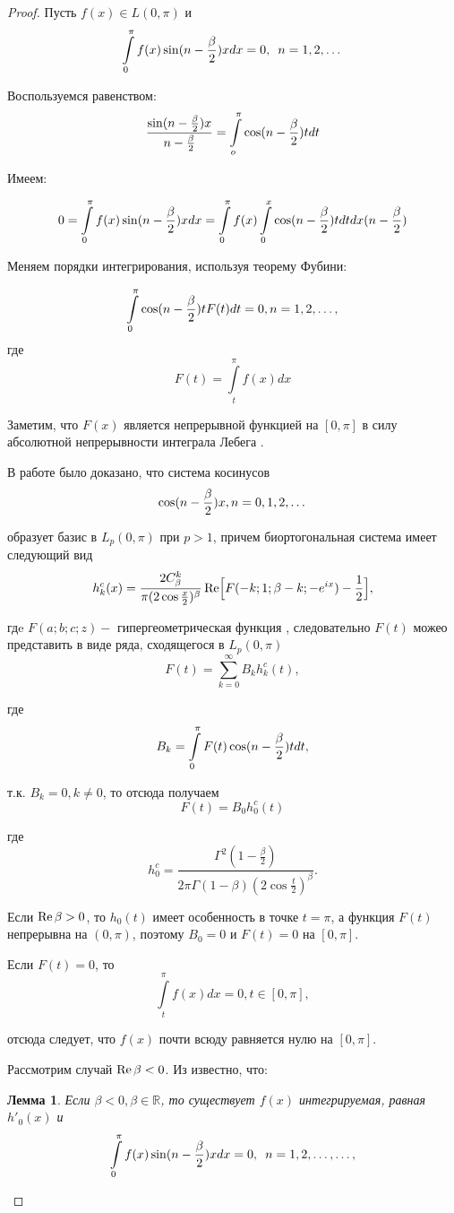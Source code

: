 ﻿\documentclass[oneside, final, 14pt]{extreport}
\newtheorem{lemma}{Лемма}
\begin{document}
	
	\begin{proof}
		Пусть $f(x) \in L(0, \pi)$ и $$\int\limits_0^{\pi}f(x)\sin(n - \frac{\beta}{2})xdx = 0, \enspace n = 1, 2, \dots$$
		
		Воспользуемся равенством:
		$$
			\frac{\sin(n - \frac{\beta}{2})x}{n - \frac{\beta}{2}} = \int\limits_o^\pi\cos(n - \frac{\beta}{2})tdt
		$$
		
		Имеем:
		
		$$
			 0 = \int\limits_0^\pi f(x)\sin(n - \frac{\beta}{2})xdx = \int\limits_0^\pi f(x) \int\limits_0^x\cos(n - \frac{\beta}{2})tdtdx(n - \frac{\beta}{2})
		$$
		
		Меняем порядки интегрирования, используя теорему Фубини:
	
		$$
			\int\limits_0^\pi\cos(n - \frac{\beta}{2})tF(t)dt = 0, n = 1, 2, \dots,
		$$
		где
		$$
			F(t) = \int\limits_t^\pi f(x) dx
		$$
		
		Заметим, что $F(x)$ является непрерывной функцией на $[0, \pi]$ в силу абсолютной непрерывности 
		интеграла Лебега \cite{kolm}.
		
		В работе \cite{moi:dan} было доказано, что система косинусов
		$$
			\cos(n - \frac{\beta}{2})x, n = 0, 1, 2, \dots
		$$
		
		образует базис в $L_p(0, \pi)$ при $p > 1$, причем биортогональная система имеет следующий вид
		$$
			h^c_k(x) = \frac{2C^k_\beta}{\pi(2\cos\frac{x}{2})^\beta}
			\operatorname{Re}\Bigl[F(-k; 1; \beta - k; -e^{ix}) - \frac{1}{2}\Bigr],
		$$
		
		гдe $F(a; b; c; z) - $ гипергеометрическая функция \cite{bateman}, следовательно $F(t)$ можео представить
		в виде ряда, сходящегося в $L_p(0, \pi)$
		$$
			F(t) = \sum\limits^\infty_{k = 0}B_k h^c_k(t), 
		$$
		
		где 
		$$
			B_k = \int\limits_0^\pi F(t) \cos(n - \frac{\beta}{2})tdt,
		$$
		
		т.к. $B_k = 0, k \neq 0$, то отсюда получаем 
		$$
			F(t) = B_0 h^c_0(t)
		$$
		
		где 
		$$
			h^c_0 = \frac{\Gamma^2(1 - \frac{\beta}{2})}{2\pi \Gamma(1- \beta)(2\cos\frac{t}{2})^\beta}.
		$$
		
		Если $\operatorname{Re}\beta > 0$, то $h_0(t)$ имеет особенность в точке $t = \pi$, а функция $F(t)$ непрерывна на $(0, \pi)$,
		поэтому $B_0 = 0$ и $F(t) = 0$ на $[0, \pi]$.
		
		Если $F(t) = 0$, то 
		$$
			\int\limits_t^\pi f(x)dx = 0, t \in [0, \pi],
		$$
		
		отсюда следует, что $f(x)$ почти всюду равняется нулю на $[0, \pi]$.
		
		Рассмотрим случай $\operatorname{Re}\beta < 0$. Из \cite{moi:gul} известно, что:
		\begin{lemma}
			Если $\beta < 0, \beta\in\mathbb{R}$, то существует $f(x)$ интегрируемая, равная $h'_0(x)$ и 
			$$
				\int\limits_0^{\pi}f(x)\sin(n - \frac{\beta}{2})xdx = 0, \enspace n = 1, 2, \dots, \dots,
			$$
			

\end{lemma}
\end{proof}
\end{document}
